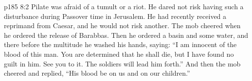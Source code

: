 \vs p185 8:2 \pc Pilate was afraid of a tumult or a riot. He dared not risk having such a disturbance during Passover time in Jerusalem. He had recently received a reprimand from Caesar, and he would not risk another. The mob cheered when he ordered the release of Barabbas. Then he ordered a basin and some water, and there before the multitude he washed his hands, saying: “I am innocent of the blood of this man. You are determined that he shall die, but I have found no guilt in him. See you to it. The soldiers will lead him forth.” And then the mob cheered and replied, “His blood be on us and on our children.”
